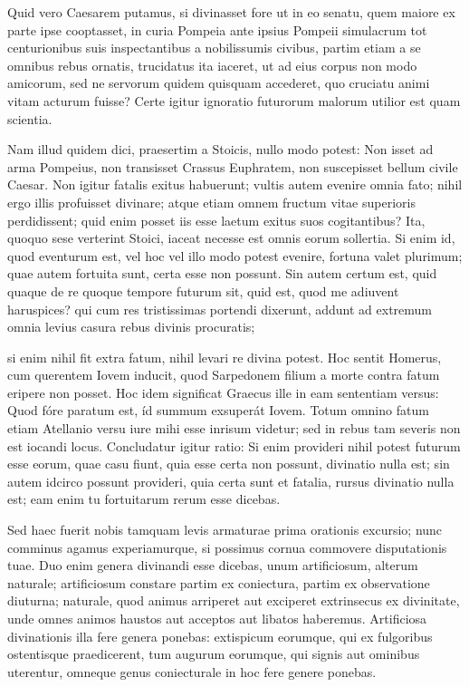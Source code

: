  Quid vero Caesarem putamus, si divinasset fore ut in eo senatu, quem maiore ex parte ipse cooptasset, in curia Pompeia ante ipsius Pompeii simulacrum tot centurionibus suis inspectantibus a nobilissumis civibus, partim etiam a se omnibus rebus ornatis, trucidatus ita iaceret, ut ad eius corpus non modo amicorum, sed ne servorum quidem quisquam accederet, quo cruciatu animi vitam acturum fuisse? Certe igitur ignoratio futurorum malorum utilior est quam scientia.

 Nam illud quidem dici, praesertim a Stoicis, nullo modo potest: Non isset ad arma Pompeius, non transisset Crassus Euphratem, non suscepisset bellum civile Caesar. Non igitur fatalis exitus habuerunt; vultis autem evenire omnia fato; nihil ergo illis profuisset divinare; atque etiam omnem fructum vitae superioris perdidissent; quid enim posset iis esse laetum exitus suos cogitantibus? Ita, quoquo sese verterint Stoici, iaceat necesse est omnis eorum sollertia. Si enim id, quod eventurum est, vel hoc vel illo modo potest evenire, fortuna valet plurimum; quae autem fortuita sunt, certa esse non possunt. Sin autem certum est, quid quaque de re quoque tempore futurum sit, quid est, quod me adiuvent haruspices? qui cum res tristissimas portendi dixerunt, addunt ad extremum omnia levius casura rebus divinis procuratis;

 si enim nihil fit extra fatum, nihil levari re divina potest. Hoc sentit Homerus, cum querentem Iovem inducit, quod Sarpedonem filium a morte contra fatum eripere non posset. Hoc idem significat Graecus ille in eam sententiam versus: Quod fóre paratum est, íd summum exsuperát Iovem. Totum omnino fatum etiam Atellanio versu iure mihi esse inrisum videtur; sed in rebus tam severis non est iocandi locus. Concludatur igitur ratio: Si enim provideri nihil potest futurum esse eorum, quae casu fiunt, quia esse certa non possunt, divinatio nulla est; sin autem idcirco possunt provideri, quia certa sunt et fatalia, rursus divinatio nulla est; eam enim tu fortuitarum rerum esse dicebas.

 Sed haec fuerit nobis tamquam levis armaturae prima orationis excursio; nunc comminus agamus experiamurque, si possimus cornua commovere disputationis tuae. Duo enim genera divinandi esse dicebas, unum artificiosum, alterum naturale; artificiosum constare partim ex coniectura, partim ex observatione diuturna; naturale, quod animus arriperet aut exciperet extrinsecus ex divinitate, unde omnes animos haustos aut acceptos aut libatos haberemus. Artificiosa divinationis illa fere genera ponebas: extispicum eorumque, qui ex fulgoribus ostentisque praedicerent, tum augurum eorumque, qui signis aut ominibus uterentur, omneque genus coniecturale in hoc fere genere ponebas.

